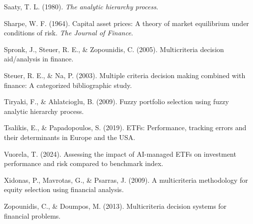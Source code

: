 \documentclass[12pt,letterpaper]{article}
\newcommand{\apa}[1]{\begingroup\sloppy\hangindent=1.25cm\hangafter=1 #1\par\vspace{0.35em}\endgroup}
\begin{document}
\apa{Saaty, T. L. (1980). \textit{The analytic hierarchy process}.}

\apa{Sharpe, W. F. (1964). Capital asset prices: A theory of market equilibrium under conditions of risk. \textit{The Journal of Finance}.}

\apa{Spronk, J., Steuer, R. E., \& Zopounidis, C. (2005). Multicriteria decision aid/analysis in finance.}

\apa{Steuer, R. E., \& Na, P. (2003). Multiple criteria decision making combined with finance: A categorized bibliographic study.}

\apa{Tiryaki, F., \& Ahlatcioglu, B. (2009). Fuzzy portfolio selection using fuzzy analytic hierarchy process.}

\apa{Tsalikis, E., \& Papadopoulos, S. (2019). ETFs: Performance, tracking errors and their determinants in Europe and the USA.}

\apa{Vuorela, T. (2024). Assessing the impact of AI-managed ETFs on investment performance and risk compared to benchmark index.}

\apa{Xidonas, P., Mavrotas, G., \& Psarras, J. (2009). A multicriteria methodology for equity selection using financial analysis.}

\apa{Zopounidis, C., \& Doumpos, M. (2013). Multicriteria decision systems for financial problems.}
\end{document}
